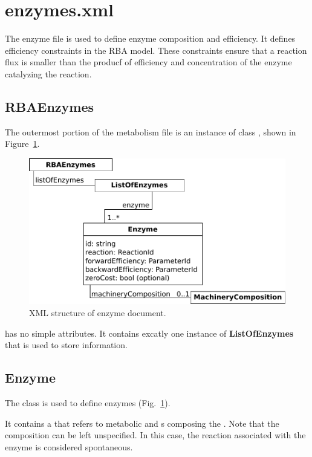 
\section{enzymes.xml}

The enzyme file is used to define enzyme composition and efficiency.
It defines efficiency constraints in the RBA model.
These constraints ensure that a reaction flux is smaller than
the producf of efficiency and concentration of the enzyme catalyzing
the reaction.

\subsection{RBAEnzymes}
\label{sec:rba_enzymes}

The outermost portion of the metabolism file is an instance of class
\rbaenzymes, shown in Figure~\ref{fig:enzymes_doc}.

\begin{figure}
  \centering
  \includegraphics[scale=0.8]{figures/enzymes_doc}
  \caption{XML structure of enzyme document.}
\label{fig:enzymes_doc}
\end{figure}

\rbaenzymes{} has no simple attributes.
It contains excatly one instance of \textbf{ListOfEnzymes} that is used
to store \enzyme{} information.


\subsection{Enzyme}
\label{sec:enzyme}

The \enzyme{} class is used to define enzymes
(Fig.~\ref{fig:enzymes_doc}).

It contains a \machinerycomposition{} that refers to metabolic \species{}
and \macromolecule{}s composing the \enzyme{}.
Note that the composition can be left unspecified.
In this case, the reaction associated with the enzyme is considered spontaneous.

